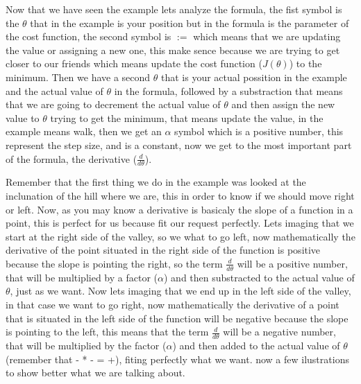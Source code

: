 \documentclass[12pt,journal]{IEEEtran}
\begin{document}
    Now that we have seen the example lets analyze the formula, the fist symbol
    is the $\theta$ that in the example is your position but in the
    formula is the parameter of the cost function, the second symbol is $:=$
    which means that we are updating the value or assigning a new one,
    this make sence because we are trying to get closer to our friends which
    means update the cost function ($J(\theta)$) to the minimum. Then we
    have a second $\theta$ that is your actual possition in the example and
    the actual value of $\theta$ in the formula, followed by a substraction
    that means that we are going to decrement the actual value of $\theta$
    and then assign the new value to $\theta$ trying to get the minimum,
    that means update the value, in the example means walk, then we get an
    $\alpha$ symbol which is a positive number, this represent the step size,
    and is a constant, now we get to the most important part of the formula, the
    derivative ($\frac{d}{d \theta}$).

    Remember that the first thing we do in the example was looked at the
    inclunation of the hill where we are, this in order to know if we should
    move right or left. Now, as you may know a derivative is basicaly the
    slope of a function in a point, this is perfect for us because fit our
    request perfectly. Lets imaging that we start at the right side of the
    valley, so we what to go left, now mathematically the derivative of the
    point situated in the right side of the function is positive because the
    slope is pointing the right, so the term $\frac{d}{d \theta}$ will be a
    positive number, that will be multiplied by a factor ($\alpha$) and then
    substracted to the actual value of $\theta$, just as we want.
    Now lets imaging that we end up in the left side of the valley, in that case
    we want to go right, now mathematically the derivative of a point that is
    situated in the left side of the function will be negative because the
    slope is pointing to the left, this means that the term $\frac{d}{d \theta}$
    will be a negative number, that will be multiplied by the factor ($\alpha$)
    and then added to the actual value of $\theta$ (remember that - * - = +),
    fiting perfectly what we want. now a few ilustrations to show better what we
    are talking about.

    \vspace{3cm}
\end{document}
